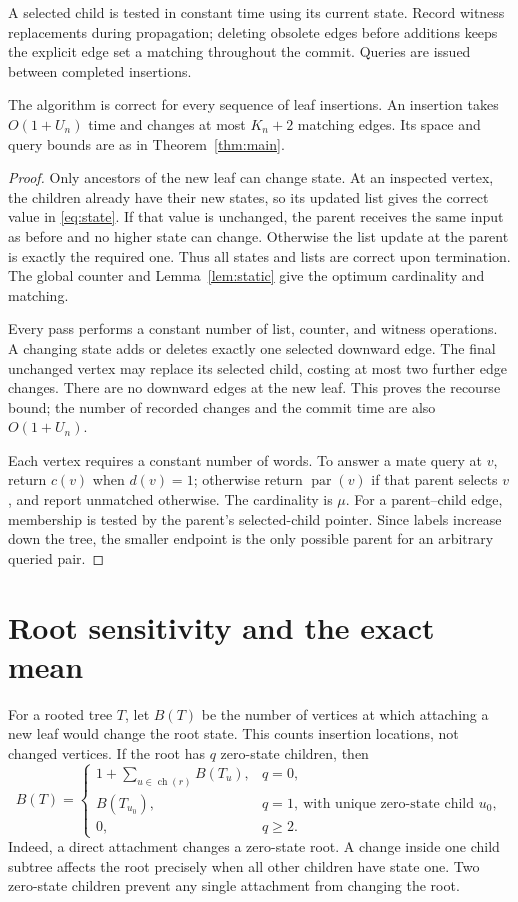 \documentclass[runningheads,envcountsame,orivec]{llncs}
\newcommand{\ch}{\operatorname{ch}}
\newcommand{\parnt}{\operatorname{par}}
\begin{document}
A selected child is tested in constant time using its current state.
Record witness replacements during propagation; deleting obsolete edges
before additions keeps the explicit edge set a matching throughout the
commit. Queries are issued between completed insertions.

\begin{lemma}\label{lem:implementation}
The algorithm is correct for every sequence of leaf insertions. An
insertion takes $O(1+U_n)$ time and changes at most $K_n+2$ matching
edges. Its space and query bounds are as in Theorem~\ref{thm:main}.
\end{lemma}
\begin{proof}
Only ancestors of the new leaf can change state. At an inspected vertex,
the children already have their new states, so its updated list gives
the correct value in \eqref{eq:state}. If that value is unchanged, the
parent receives the same input as before and no higher state can change.
Otherwise the list update at the parent is exactly the required one.
Thus all states and lists are correct upon termination. The global
counter and Lemma~\ref{lem:static} give the optimum cardinality and
matching.

Every pass performs a constant number of list, counter, and witness
operations. A changing state adds or deletes exactly one selected
downward edge. The final unchanged vertex may replace its selected
child, costing at most two further edge changes. There are no downward
edges at the new leaf. This proves the recourse bound; the number of
recorded changes and the commit time are also $O(1+U_n)$.

Each vertex requires a constant number of words. To answer a mate query
at $v$, return $c(v)$ when $d(v)=1$; otherwise return $\parnt(v)$ if
that parent selects $v$, and report unmatched otherwise. The cardinality
is $\mu$. For a parent--child edge, membership is tested by the parent's
selected-child pointer. Since labels increase down the tree, the smaller
endpoint is the only possible parent for an arbitrary queried pair.
\end{proof}

\section{Root sensitivity and the exact mean}\label{sec:mean}

For a rooted tree $T$, let $B(T)$ be the number of vertices at which
attaching a new leaf would change the root state. This counts insertion
locations, not changed vertices. If the root has $q$ zero-state children,
then
\begin{equation}\label{eq:Brec}
 B(T)=
 \begin{cases}
  1+\sum_{u\in\ch(r)}B(T_u),&q=0,\\
  B(T_{u_0}),&q=1,\ \text{with unique zero-state child }u_0,\\
  0,&q\ge2.
 \end{cases}
\end{equation}
Indeed, a direct attachment changes a zero-state root. A change inside
one child subtree affects the root precisely when all other children
have state one. Two zero-state children prevent any single attachment
from changing the root.
\end{document}
